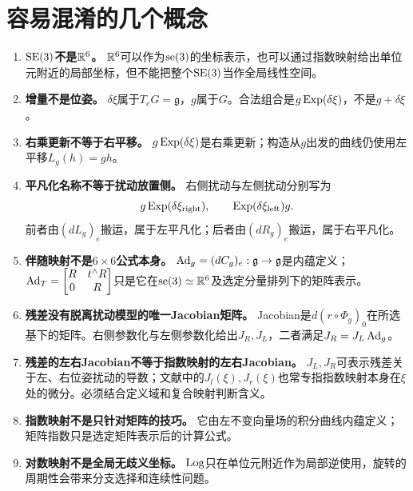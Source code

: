 
\section{容易混淆的几个概念}

\begin{enumerate}
    \item \textbf{$\operatorname{SE}(3)$不是$\mathbb{R}^6$。} $\mathbb{R}^6$可以作为$\operatorname{se}(3)$的坐标表示，也可以通过指数映射给出单位元附近的局部坐标，但不能把整个$\operatorname{SE}(3)$当作全局线性空间。

    \item \textbf{增量不是位姿。} $\delta\xi$属于$T_eG=\mathfrak g$，$g$属于$G$。合法组合是$g\operatorname{Exp}(\delta\xi)$，不是$g+\delta\xi$。

    \item \textbf{右乘更新不等于右平移。}
    $g\operatorname{Exp}(\delta\xi)$是右乘更新；构造从$g$出发的曲线仍使用左平移$L_g(h)=gh$。

    \item \textbf{平凡化名称不等于扰动放置侧。}
    右侧扰动与左侧扰动分别写为
    \[
        g\operatorname{Exp}(\delta\xi_{\mathrm{right}}),
        \qquad
        \operatorname{Exp}(\delta\xi_{\mathrm{left}})g.
    \]
    前者由$(dL_g)_e$搬运，属于左平凡化；后者由$(dR_g)_e$搬运，属于右平凡化。

    \item \textbf{伴随映射不是$6\times6$公式本身。}
    $\operatorname{Ad}_g=(dC_g)_e:\mathfrak g\to\mathfrak g$是内蕴定义；$\operatorname{Ad}_T=\begin{bmatrix}R&t^\wedge R\\0&R\end{bmatrix}$只是它在$\operatorname{se}(3)\simeq\mathbb{R}^6$及选定分量排列下的矩阵表示。

    \item \textbf{残差没有脱离扰动模型的唯一Jacobian矩阵。}
    Jacobian是$d(r\circ\Phi_g)_0$在所选基下的矩阵。右侧参数化与左侧参数化给出$J_R,J_L$，二者满足$J_R=J_L\operatorname{Ad}_g$。

    \item \textbf{残差的左右Jacobian不等于指数映射的左右Jacobian。}
    $J_L,J_R$可表示残差关于左、右位姿扰动的导数；文献中的$J_l(\xi),J_r(\xi)$也常专指指数映射本身在$\xi$处的微分。必须结合定义域和复合映射判断含义。

    \item \textbf{指数映射不是只针对矩阵的技巧。} 它由左不变向量场的积分曲线内蕴定义；矩阵指数只是选定矩阵表示后的计算公式。

    \item \textbf{对数映射不是全局无歧义坐标。} $\operatorname{Log}$只在单位元附近作为局部逆使用，旋转的周期性会带来分支选择和连续性问题。


\end{enumerate}
